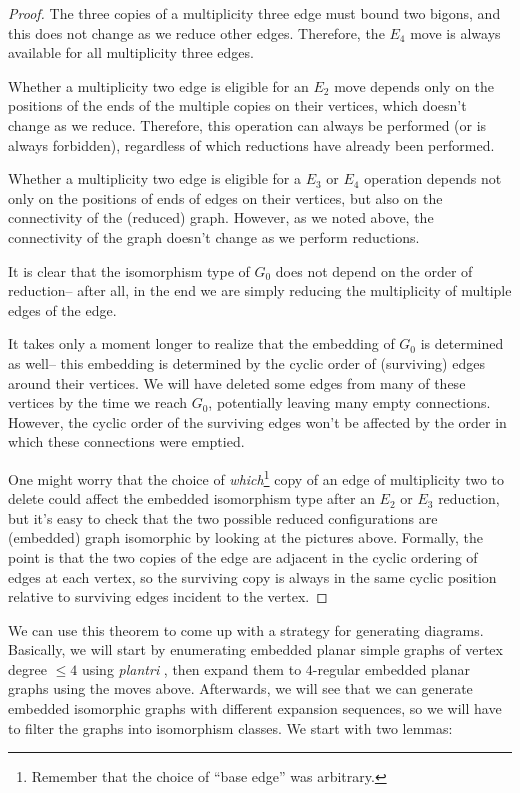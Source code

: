 \documentclass[amsmath,secnumarabic,floatfix,amssymb,nofootinbib,nobibnotes,letterpaper,11pt,tightenlines,showkeys]{revtex4}
\theoremstyle{definition}
\newcommand{\edgedouble}{E_2}
\newcommand{\cutedgedouble}{E_3}
\newcommand{\pairinsert}{E_4}
\newcommand{\plantri}{\textit{plantri} }
\begin{document}
\begin{proof}
The three copies of a multiplicity three edge must bound two bigons, and this does not change as we reduce other edges. Therefore, the $\pairinsert$ move is always available for all multiplicity three edges.

Whether a multiplicity two edge is eligible for an $\edgedouble$ move depends only on the positions of the ends of the multiple copies on their vertices, which doesn't change as we reduce. Therefore, this operation can always be performed (or is always forbidden), regardless of which reductions have already been performed.

Whether a multiplicity two edge is eligible for a $\cutedgedouble$ or $\pairinsert$ operation depends not only on the positions of ends of edges on their vertices, but also on the connectivity of the (reduced) graph. However, as we noted above, the connectivity of the graph doesn't change as we perform reductions.

It is clear that the isomorphism type of $G_0$ does not depend on the order of reduction-- after all, in the end we are simply reducing the multiplicity of multiple edges of the edge. 

It takes only a moment longer to realize that the embedding of $G_0$ is determined as well-- this embedding is determined by the cyclic order of (surviving) edges around their vertices. We will have deleted some edges from many of these vertices by the time we reach $G_0$, potentially leaving many empty connections. However, the cyclic order of the surviving edges won't be affected by the order in which these connections were emptied. 

One might worry that the choice of \emph{which}\footnote{Remember that the choice of ``base edge'' was arbitrary.} copy of an edge of multiplicity two to delete could affect the embedded isomorphism type after an $\edgedouble$ or $\cutedgedouble$ reduction, but it's easy to check that the two possible reduced configurations are (embedded) graph isomorphic by looking at the pictures above. Formally, the point is that the two copies of the edge are adjacent in the cyclic ordering of edges at each vertex, so the surviving copy is always in the same cyclic position relative to surviving edges incident to the vertex.
\end{proof}

We can use this theorem to come up with a strategy for generating diagrams. Basically, we will start by enumerating embedded planar simple graphs of vertex degree $\leq 4$ using \plantri, then expand them to $4$-regular embedded planar graphs using the moves above. Afterwards, we will see that we can generate embedded isomorphic graphs with different expansion sequences, so we will have to filter the graphs into isomorphism classes. We start with two lemmas:
\end{document}
